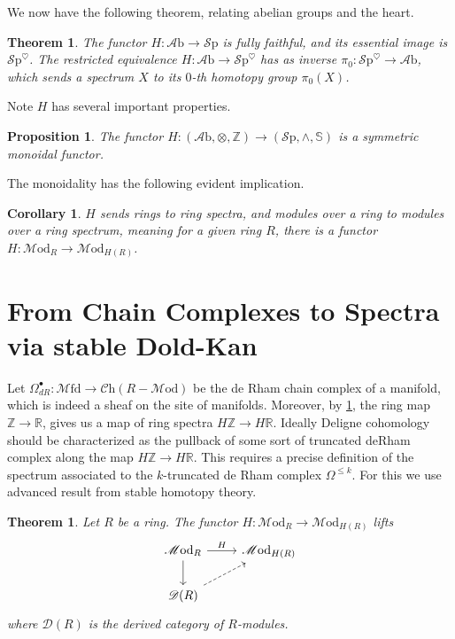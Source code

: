 \documentclass[10pt]{amsart}
\newcommand{\D}{\mathscr{D}}
\newcommand{\bR}{\mathbb{R}}
\newcommand{\bS}{\mathbb{S}}
\newcommand{\bZ}{\mathbb{Z}}
\newcommand{\Sp}{\mathscr{S}\mathrm{p}}
\newcommand{\Ch}{\mathscr{C}\mathrm{h}}
\newcommand{\Mfd}{\mathscr{M}\mathrm{fd}}
\newcommand{\Mod}{\mathscr{M}\mathrm{od}}
\newcommand{\Ab}{\mathscr{A}\mathrm{b}}
\newtheorem{theorem}[equation]{Theorem}
\newtheorem{proposition}[equation]{Proposition}
\newtheorem{corollary}[equation]{Corollary}
\theoremstyle{definition}
\theoremstyle{remark}
\begin{document}
We now have the following theorem, relating abelian groups and the heart.

\begin{theorem}
  The functor $H\colon \Ab \to \Sp$ is fully faithful, and its essential image is $\Sp^{\heartsuit}$. The restricted equivalence $H\colon \Ab \to \Sp^{\heartsuit}$ has as inverse $\pi_0\colon \Sp^{\heartsuit} \to \Ab$, which sends a spectrum $X$ to its $0$-th homotopy group $\pi_0(X)$.
\end{theorem}

Note $H$ has several important properties.

\begin{proposition}
  The functor $H\colon (\Ab,\otimes, \bZ) \to (\Sp,\wedge, \bS)$ is a symmetric monoidal functor.  
\end{proposition}

The monoidality has the following evident implication.

\begin{corollary} \label{cor:rings}
  $H$ sends rings to ring spectra, and modules over a ring to modules over a ring spectrum, meaning for a given ring $R$, there is a functor $H\colon \Mod_{R} \to \Mod_{H(R)}$.
\end{corollary}

\section{From Chain Complexes to Spectra via stable Dold-Kan}
Let $\Omega^\bullet_{dR}\colon \Mfd \to \Ch(R-\Mod)$ be the de Rham chain complex of a manifold, which is indeed a sheaf on the site of manifolds. Moreover, by \cref{cor:rings}, the ring map $\bZ \to \bR$, gives us a map of ring spectra $H\bZ \to H\bR$. Ideally Deligne cohomology should be characterized as the pullback of some sort of truncated deRham complex along the map $H\bZ \to H\bR$. This requires a precise definition of the spectrum associated to the $k$-truncated de Rham complex $\Omega^{\leq k}$. For this we use advanced result from stable homotopy theory.

\begin{theorem}
Let $R$ be a ring. The functor $H\colon \Mod_{R} \to \Mod_{H(R)}$ lifts
\[
\begin{tikzcd}
 \Mod_R \arrow[r, "H"] \arrow[d] & \Mod_{H(R)} \\
 \D(R) \arrow[ur, dashed]
\end{tikzcd}
\]
where $\D(R)$ is the derived category of $R$-modules.
\end{theorem}
\end{document}
